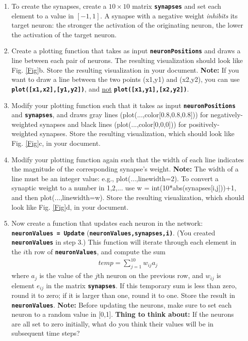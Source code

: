 \documentclass[12pt]{article}
\begin{document}
\begin{enumerate}
\item To create the synapses, create a $10 \times 10$ matrix \textbf{\texttt{synapses}} and set each element to a value in $[-1,1]$. A synapse with a negative weight \textit{inhibits} its target neuron: the stronger the activation of the originating neuron, the lower the activation of the target neuron.

\item Create a plotting function that takes as input \textbf{\texttt{neuronPositions}} and draws a line between each pair of neurons. The resulting visualization should look like Fig. \ref{Fig}b. Store the resulting visualization in your document. \textbf{Note:} If you want to draw a line between the two points (x1,y1) and (x2,y2), you can use \textbf{\texttt{plot([x1,x2],[y1,y2])}}, and \underline{not} \textbf{\texttt{plot([x1,y1],[x2,y2])}}.

\item Modify your plotting function such that it takes as input \textbf{\texttt{neuronPositions}} and \textbf{\texttt{synapses}}, and draws gray lines
    (plot(...,color[0.8,0.8,0.8]))
    for negatively-weighted synapses and black lines
    (plot(...,color[0,0,0])) for positively-weighted synapses. Store the resulting visualization, which should look like Fig. \ref{Fig}c, in your document.

\item Modify your plotting function again such that the width of each line indicates the magnitude of the corresponding synapse's weight. \textbf{Note:} The width of a line must be an integer value: e.g., plot(...,linewidth=2). To convert a synaptic weight to a number in 1,2,... use w = int(10*abs(synapses[i,j]))+1, and then plot(...,linewidth=w). Store the resulting visualization, which should look like Fig. \ref{Fig}d, in your document.

\item Now create a function that updates each neuron in the network: \textbf{\texttt{neuronValues = Update}} (\textbf{\texttt{neuronValues,synapses,i)}}.
    (You created \textbf{\texttt{neuronValues}} in step 3.)
    This function will iterate through each element in the $i$th row of \textbf{\texttt{neuronValues}}, and compute the sum
    \begin{eqnarray}
    temp = \sum_{j=1}^{10} w_{ij} a_{j}
    \end{eqnarray}
    where $a_{j}$ is the value of the $j$th neuron on the previous row, and
    $w_{ij}$ is element $e_{ij}$ in the matrix \textbf{\texttt{synapses}}. If this temporary sum is less than zero, round it to zero; if it is larger than one, round it to one. Store the result in \textbf{\texttt{neuronValues}}. \textbf{Note:} Before updating the neurons, make sure to set each neuron to a random value in [0,1]. \textbf{Thing to think about:} If the neurons are all set to zero initially, what do you think their values will be in subsequent time steps?


\end{enumerate}
\end{document}
